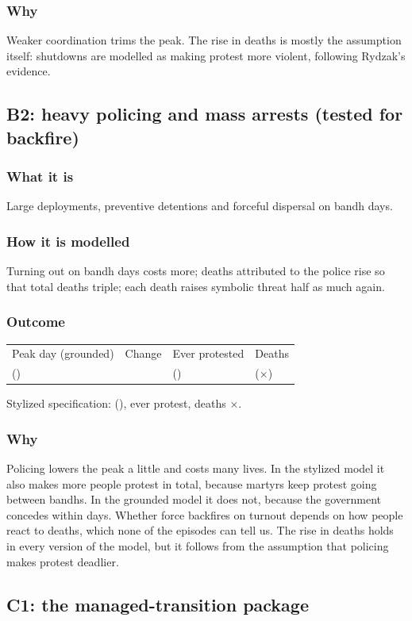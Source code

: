 \documentclass[11pt,a4paper]{article}
\makeatletter
\newcommand{\outcomeline}[6]{%
  \begin{tabular}{@{}llll@{}}
  \sffamily\small\color{muted}Peak day (grounded) & \sffamily\small\color{muted}Change & \sffamily\small\color{muted}Ever protested & \sffamily\small\color{muted}Deaths\\
  \textbf{#1} \small(#2) & \textbf{#3} & #4 & #5\\
  \end{tabular}\par\smallskip
  {\small\color{muted}Stylized specification: #6}\par}
\makeatother
\begin{document}
\subsubsection{Why}
Weaker coordination trims the peak. The rise in deaths is mostly the assumption itself: shutdowns are modelled as making protest more violent, following Rydzak's evidence.

\subsection{B2: heavy policing and mass arrests (tested for backfire)}
\subsubsection{What it is}
Large deployments, preventive detentions and forceful dispersal on bandh days.
\subsubsection{How it is modelled}
Turning out on bandh days costs more; deaths attributed to the police rise so that total deaths triple; each death raises symbolic threat half as much again.
\subsubsection{Outcome}
\outcomeline{\PeakGroundedHeavyPolicing}{\PeakRangeGroundedHeavyPolicing}{\PeakChangeGroundedHeavyPolicing}{\CumulativeGroundedHeavyPolicing{} (\CumulativeChangeGroundedHeavyPolicing)}{\DeathsGroundedHeavyPolicing{} (×\DeathRatioGroundedHeavyPolicing)}{\PeakCentralHeavyPolicing{} (\PeakChangeCentralHeavyPolicing), \CumulativeChangeCentralHeavyPolicing{} ever protest, deaths ×\DeathRatioCentralHeavyPolicing.}
\subsubsection{Why}
Policing lowers the peak a little and costs many lives. In the stylized model it also makes more people protest in total, because martyrs keep protest going between bandhs. In the grounded model it does not, because the government concedes within days. Whether force backfires on turnout depends on how people react to deaths, which none of the episodes can tell us. The rise in deaths holds in every version of the model, but it follows from the assumption that policing makes protest deadlier.

\subsection{C1: the managed-transition package}
\end{document}
